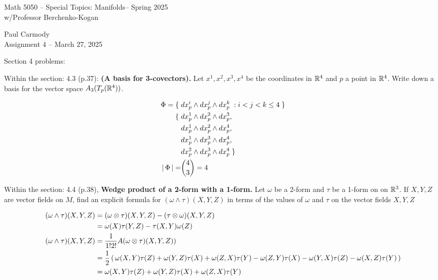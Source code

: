 \documentclass[10pt,a4paper]{report}
\newcommand{\CLASSNAME}{Math 5050 -- Special Topics: Manifolds}
\newcommand{\STUDENTNAME}{Paul Carmody}
\newcommand{\ASSIGNMENT}{Assignment 4 }
\newcommand{\DUEDATE}{March 27, 2025}
\newcommand{\SEMESTER}{Spring 2025}
\newcommand{\BLUE}[1]{\textcolor{blue}{#1}}
\begin{document}
\begin{center}
	\Large{\CLASSNAME -- \SEMESTER} \\
	\large{ w/Professor Berchenko-Kogan}
\end{center}
\begin{center}
	\STUDENTNAME \\
	\ASSIGNMENT -- \DUEDATE\\
\end{center} 

\noindent Section 4 problems:

\begin{description}
	\item Within the section: 4.3 (p.37): \textbf{(A basis for 3-covectors).}  Let $x^1, x^2,x^3, x^4$ be the coordinates in $\mathbb{R}^4$ and $p$ a point in $\mathbb{R}^4$.  Write down a basis for the vector space $A_3(T_p(\mathbb{R}^4))$.
	
	\BLUE{\begin{align*}
		\Phi =\{\; &dx_p^i\wedge dx_p^j \wedge dx_p^k\;: i<j<k \le 4\;\}\\ 
		 \{\; &dx_p^1\wedge dx_p^2 \wedge dx_p^3, \\
		   &dx_p^1\wedge dx_p^2 \wedge dx_p^4,\\
		   &dx_p^1\wedge dx_p^3 \wedge dx_p^4,\\
		   &dx_p^2\wedge dx_p^3 \wedge dx_p^4 \;\} \\
		   \left |\, \Phi \,\right | = &\binom{4}{3} = 4
	\end{align*}
	}
	
	\item Within the section: 4.4 (p.38), \textbf{Wedge product of a 2-form with a 1-form.}  Let $\omega$ be a 2-form and $\tau$ be a 1-form on on $\mathbb{R}^3$.  If $X,Y,Z$ are vector fields on $M$, find an explicit formula for $(\omega\wedge\tau)(X,Y,Z)$ in terms of the values of $\omega$ and $\tau$ on the vector fields $X,Y,Z$
	
	\BLUE{
	\begin{align*}
		(\omega \wedge \tau)(X,Y,Z) &= (\omega\otimes\tau)(X,Y,Z) - (\tau\otimes\omega)(X,Y,Z) \\
		&= \omega(X)\tau(Y,Z) - \tau(X,Y)\omega(Z)\\
		(\omega \wedge \tau)(X,Y,Z) &= \frac{1}{1!2!}A(\omega \otimes\tau)(X,Y,Z)) \\
		&= \frac{1}{2}\left (\,  \omega(X,Y)\tau(Z) +
		\omega(Y,Z)\tau(X) +
		\omega(Z,X)\tau(Y) -
		\omega(Z,Y)\tau(X) -
		\omega(Y,X)\tau(Z) -
		\omega(X,Z)\tau(Y)  \,\right )\\
		&= \omega(X,Y)\tau(Z) +
		\omega(Y,Z)\tau(X) +
		\omega(Z,X)\tau(Y)
	\end{align*}
	}
	

\end{description}
\end{document}
